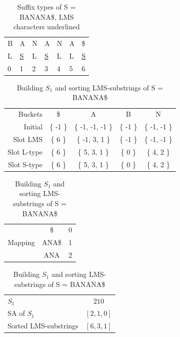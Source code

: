 \begin{table}[t]
    \begin{center}
        \begin{tabular}[c]{l l l l l l l}
            B & A & N & A & N & A & \$ \\ 
            L & \underline{S} & L & \underline{S} & L & L & \underline{S} \\ 
            0 & 1 & 2 & 3 & 4 & 5 & 6 \\ 
        \end{tabular}
    \end{center}
    \caption{Suffix types of S = BANANA\$, LMS characters underlined}
    \label{tab:suffixtypesbanana}
\end{table}


\begin{table}[t]
    \begin{center}
        \begin{tabular}[c]{r|cccc}
            Buckets & \$ & A & B & N\\
            Initial & \{ -1 \} & \{ -1, -1, -1 \} & \{ -1 \} & \{ -1, -1 \}\\
            Slot LMS & \{  6 \} & \{ -1,  3,  1 \} & \{ -1 \} & \{ -1, -1 \}\\
            Slot L-type & \{  6 \} & \{  5,  3,  1 \} & \{  0 \} & \{  4,  2 \}\\
            Slot S-type & \{  6 \} & \{  5,  3,  1 \} & \{  0 \} & \{  4,  2 \}\\
        \end{tabular}

        \vspace{0.5cm}
        \begin{tabular}[c]{r|c|c}
                    & \$ & 0 \\
            Mapping & ANA\$ & 1 \\
                    & ANA & 2 \\
        \end{tabular}

        \vspace{0.5cm}

        \begin{tabular}[c]{l|c}
                    $S_1$ & $210$ \\
                    SA of $S_1$ & $[2, 1, 0]$ \\
                    Sorted LMS-substrings & $[6, 3, 1]$ \\
        \end{tabular}

    \end{center}
    \caption{Building $S_1$ and sorting LMS-substrings of S = BANANA\$}
    \label{tab:bucketinglms}
\end{table}


